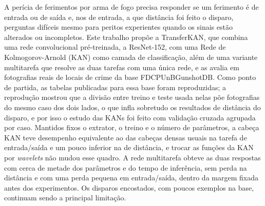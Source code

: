 A perícia de ferimentos por arma de fogo precisa responder se um ferimento é de entrada ou de saída e, nos de entrada, a que distância foi feito o disparo, perguntas difíceis mesmo para peritos experientes quando os sinais estão alterados ou incompletos. Este trabalho propõe a TransferKAN, que combina uma rede convolucional pré-treinada, a ResNet-152, com uma Rede de Kolmogorov-Arnold (KAN) como camada de classificação, além de uma variante multitarefa que resolve as duas tarefas com uma única rede, e as avalia em fotografias reais de locais de crime da base FDCPUnBGunshotDB. Como ponto de partida, as tabelas publicadas para essa base foram reproduzidas; a reprodução mostrou que a divisão entre treino e teste usada nelas põe fotografias do mesmo caso dos dois lados, o que infla sobretudo os resultados de distância do disparo, e por isso o estudo das KANs foi feito com validação cruzada agrupada por caso. Mantidos fixos o extrator, o treino e o número de parâmetros, a cabeça KAN teve desempenho equivalente ao das cabeças densas usuais na tarefa de entrada/saída e um pouco inferior na de distância, e trocar as funções da KAN por \textit{wavelets} não mudou esse quadro. A rede multitarefa obteve as duas respostas com cerca de metade dos parâmetros e do tempo de inferência, sem perda na distância e com uma perda pequena em entrada/saída, dentro da margem fixada antes dos experimentos. Os disparos encostados, com poucos exemplos na base, continuam sendo a principal limitação.
